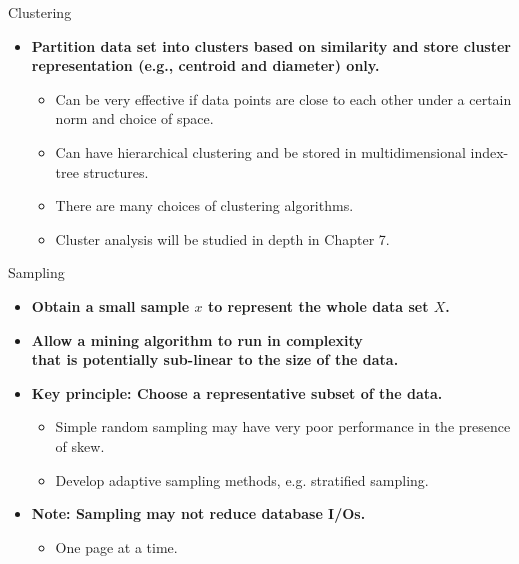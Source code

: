 \begin{frame}{Clustering}
	\begin{itemize}
		\item \textbf{Partition data set into clusters based on similarity and 
		store cluster representation (e.g., centroid and diameter) only.}
		\begin{itemize}
			\item Can be very effective if data points are close to each other 
			under a certain norm and choice of space.
			\item Can have hierarchical clustering and be stored in 
			multidimensional index-tree structures.
			\item There are many choices of clustering algorithms.
			\item Cluster analysis will be studied in depth in Chapter 7.
		\end{itemize}
	\end{itemize}
\end{frame}

\begin{frame}{Sampling}
	\begin{itemize}
		\item \textbf{Obtain a small sample $x$ to represent the whole data set 
		$X$.}
		\item \textbf{Allow a mining algorithm to run in complexity \\ that is 
		potentially sub-linear to the size of the data.}
		\item \textbf{Key principle: Choose a 
		{\color{airforceblue}representative} subset of the data.}
		\begin{itemize}
			\item Simple random sampling may have very poor performance in the 
			presence of skew.
			\item Develop adaptive sampling methods, e.g. stratified sampling.
		\end{itemize}
		\item \textbf{Note: Sampling may not reduce database I/Os.}
		\begin{itemize}
			\item One page at a time.
		\end{itemize}
	\end{itemize}
\end{frame}

